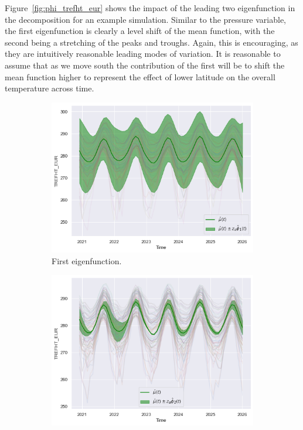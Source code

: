Figure~\ref{fig:phi_trefht_eur} shows the impact of the leading two eigenfunction in the decomposition for an example simulation. 
Similar to the pressure variable, the first eigenfunction is clearly a level shift of the mean function, with the second being a stretching of the peaks and troughs.
Again, this is encouraging, as they are intuitively reasonable leading modes of variation. 
It is reasonable to assume that as we move south the contribution of the first will be to shift the mean function higher to represent the effect of lower latitude on the overall temperature across time.

\begin{figure}
	\centering
	\begin{subfigure}[b]{0.45\textwidth}
		\includegraphics[width=\textwidth]{phi_1_trefht_eur}
		\caption{First eigenfunction.}
		\label{fig:phi_1_trefht_eur}
	\end{subfigure}
	\hfill        
	\begin{subfigure}[b]{0.45\textwidth}
		\includegraphics[width=\textwidth]{phi_2_trefht_eur}

\end{subfigure}
\end{figure}
